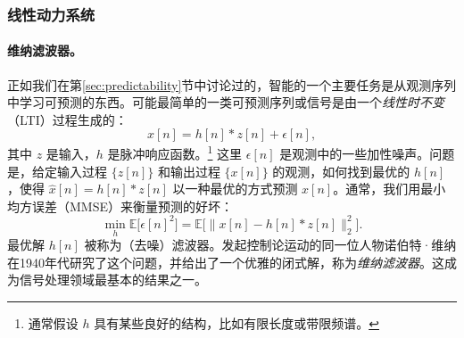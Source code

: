 \documentclass[../../book-main.tex]{subfiles}
\begin{document}

\subsubsection{线性动力系统}
\label{sec:linear-systems}

\paragraph{维纳滤波器。}

正如我们在第\ref{sec:predictability}节中讨论过的，智能的一个主要任务是从观测序列中学习可预测的东西。可能最简单的一类可预测序列或信号是由一个{\em 线性时不变}（LTI）过程生成的：
\begin{equation}
    x[n] = h[n]*z[n] + \epsilon[n], 
    \label{eqn:Wiener-model}
\end{equation}
其中 $z$ 是输入，$h$ 是脉冲响应函数。\footnote{通常假设 $h$ 具有某些良好的结构，比如有限长度或带限频谱。} 这里 $\epsilon[n]$ 是观测中的一些加性噪声。问题是，给定输入过程 $\{z[n]\}$ 和输出过程 $\{x[n]\}$ 的观测，如何找到最优的 $h[n]$，使得 $\hat x[n] = h[n]*z[n]$ 以一种最优的方式预测 $x[n]$。通常，我们用最小均方误差（MMSE）来衡量预测的好坏：
\begin{equation}
    \min_{h} \mathbb{E} \big[\epsilon[n]^2\big] = \mathbb{E} \big[\|x[n] - h[n]*z[n]\|_2^2\big].
\end{equation}
最优解 $h[n]$ 被称为（去噪）滤波器。发起控制论运动的同一位人物诺伯特·维纳在1940年代研究了这个问题，并给出了一个优雅的闭式解，称为{\em 维纳滤波器}\cite{Wiener-1942,Wiener-1949}。这成为信号处理领域最基本的结果之一。
\end{document}
